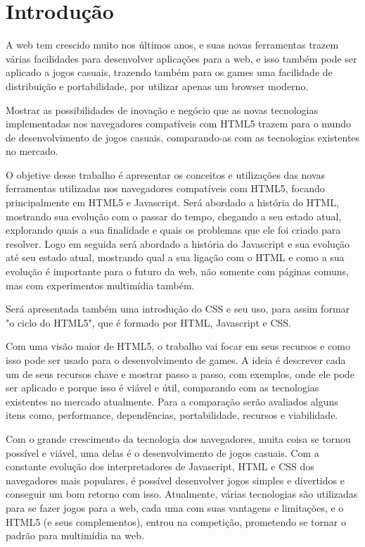 \section{Introdução}

A web tem crescido muito nos últimos anos, e suas novas ferramentas trazem várias
facilidades para desenvolver aplicações para a web, e isso também pode ser aplicado
a jogos casuais, trazendo também para os games uma facilidade de distribuição e portabilidade,
por utilizar apenas um browser moderno.

Mostrar as possibilidades de inovação e negócio que as novas tecnologias implementadas
nos navegadores compatíveis com HTML5 trazem para o mundo de desenvolvimento de jogos casuais,
comparando-as com as tecnologias existentes no mercado.

O objetive desse trabalho é apresentar os conceitos e utilizações das novas ferramentas utilizadas
nos navegadores compatíveis com HTML5, focando principalmente em HTML5 e Javascript.
Será abordado a história do HTML, mostrando sua evolução com o passar do tempo, chegando
a seu estado atual, explorando quais a sua finalidade e quais os problemas que ele foi criado para resolver.
Logo em seguida será abordado a história do Javascript e sua evolução até seu estado
atual, mostrando qual a sua ligação com o HTML e como a sua evolução é importante
para o futuro da web, não somente com páginas comuns, mas com experimentos multimídia também.

Será apresentada também uma introdução do CSS e seu uso, para assim formar "o ciclo
do HTML5", que é formado por HTML, Javascript e CSS.

Com uma visão maior de HTML5, o trabalho vai focar em seus recursos e como isso pode
ser usado para o desenvolvimento de games. A ideia é descrever cada um de seus recursos
chave e mostrar passo a passo, com exemplos, onde ele pode ser aplicado e porque isso
é viável e útil, comparando com as tecnologias existentes no mercado atualmente. Para
a comparação serão avaliados alguns itens como, performance, dependências, portabilidade, recursos e viabilidade.

Com o grande crescimento da tecnologia dos navegadores, muita coisa se tornou possível
e viável, uma delas é o desenvolvimento de jogos casuais. Com a constante evolução
dos interpretadores de Javascript, HTML e CSS dos navegadores mais populares, é possível
desenvolver jogos simples e divertidos e conseguir um bom retorno com isso. Atualmente,
várias tecnologias são utilizadas para se fazer jogos para a web, cada uma com suas
vantagens e limitações, e o HTML5 (e seus complementos), entrou na competição, prometendo
se tornar o padrão para multimídia na web.

